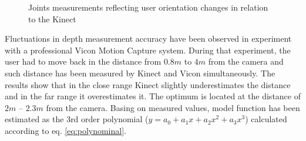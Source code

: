 \documentclass{llncs}
\begin{document}
\begin{figure}[h!]			
	\centering
	\caption{Joints measurements reflecting user orientation changes in relation to the Kinect}
	\label{fig:characteristics:kinect:orientationCharts}
\end{figure}

Fluctuations in depth measurement accuracy have been observed in experiment with a professional Vicon Motion Capture system. During that experiment, the user had to move back in the distance from $0.8m$ to $4m$ from the camera and such distance has been measured by Kinect and Vicon simultaneously. The results show that in the close range Kinect slightly underestimates the distance and in the far range it overestimates it. The optimum is located at the distance of $2m$ -- $2.3m$ from the camera.  Basing on measured values, model function has been estimated as the 3rd order polynomial ($y = a_0 + a_1x + a_2x^2 + a_3x^3$) calculated according to eq. \eqref{eq:polynominal}.
		
\end{document}
